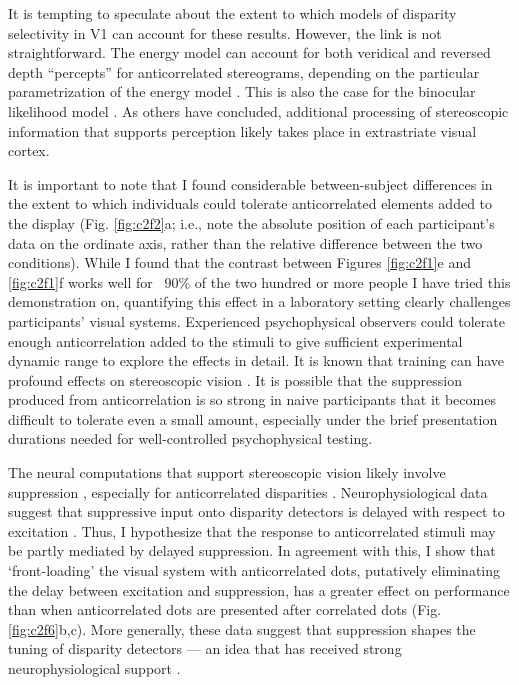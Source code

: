 It is tempting to speculate about the extent to which models of disparity selectivity in V1 can account for these results. However, the link is not straightforward. The energy model can account for both veridical and reversed depth ``percepts'' for anticorrelated stereograms, depending on the particular parametrization of the energy model \cite{Read:2002kx,Henriksen_2016}. This is also the case for the binocular likelihood model \cite{Goncalves:2017aa}. As others have concluded\cite{Cumming:1998ib,Janssen:2003fk}, additional processing of stereoscopic information that supports perception likely takes place in extrastriate visual cortex.

It is important to note that I found considerable between-subject differences in the extent to which individuals could tolerate anticorrelated elements added to the display (Fig. \ref{fig:c2f2}a; i.e., note the absolute position of each participant's data on the ordinate axis, rather than the relative difference between the two conditions). While I found that the contrast between Figures \ref{fig:c2f1}e and \ref{fig:c2f1}f works well for ~90\% of the two hundred or more people I have tried this demonstration on, quantifying this effect in a laboratory setting clearly challenges participants' visual systems. Experienced psychophysical observers could tolerate enough anticorrelation added to the stimuli to give sufficient experimental dynamic range to explore the effects in detail. It is known that training can have profound effects on stereoscopic vision \cite{Chowdhury:2008aa,Chang:2014ns}. It is possible that the suppression produced from anticorrelation is so strong in naive participants that it becomes difficult to tolerate even a small amount, especially under the brief presentation durations needed for well-controlled psychophysical testing.

The neural computations that support stereoscopic vision likely involve suppression \cite{Goncalves:2017aa,Samonds:2013cs,Haefner:2008jg,Burge:2014qj,Jaini158741}, especially for anticorrelated disparities \cite{Goncalves:2017aa}. Neurophysiological data suggest that suppressive input onto disparity detectors is delayed with respect to excitation \cite{Tanabe:2014ud}. Thus, I hypothesize that the response to anticorrelated stimuli may be partly mediated by delayed suppression. In agreement with this, I show that `front-loading' the visual system with anticorrelated dots, putatively eliminating the delay between excitation and suppression, has a greater effect on performance than when anticorrelated dots are presented after correlated dots (Fig. \ref{fig:c2f6}b,c). More generally, these data suggest that suppression shapes the tuning of disparity detectors --- an idea that has received strong neurophysiological support \cite{Tanabe:2011pt,Tanabe:2014ud,Nieder:2001jl}.

